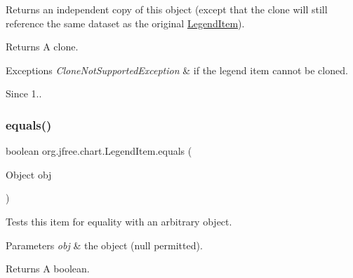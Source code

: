 Returns an independent copy of this object (except that the clone will still reference the same dataset as the original {\ttfamily \mbox{\hyperlink{classorg_1_1jfree_1_1chart_1_1_legend_item}{Legend\+Item}}}).

\begin{DoxyReturn}{Returns}
A clone.
\end{DoxyReturn}

\begin{DoxyExceptions}{Exceptions}
{\em Clone\+Not\+Supported\+Exception} & if the legend item cannot be cloned.\\
\hline
\end{DoxyExceptions}
\begin{DoxySince}{Since}
1.. 
\end{DoxySince}
\mbox{\label{classorg_1_1jfree_1_1chart_1_1_legend_item_a19816454bd9a2df69504498a048b985e}} 
\subsubsection{\texorpdfstring{equals()}{equals()}}
{\footnotesize\ttfamily boolean org.\+jfree.\+chart.\+Legend\+Item.\+equals (\begin{DoxyParamCaption}\item[{Object}]{obj }\end{DoxyParamCaption})}

Tests this item for equality with an arbitrary object.


\begin{DoxyParams}{Parameters}
{\em obj} & the object ({\ttfamily null} permitted).\\
\hline
\end{DoxyParams}
\begin{DoxyReturn}{Returns}
A boolean. 
\end{DoxyReturn}
\mbox{\label{classorg_1_1jfree_1_1chart_1_1_legend_item_a6553acc2837bf716adc7a03e215a5da3}} 
